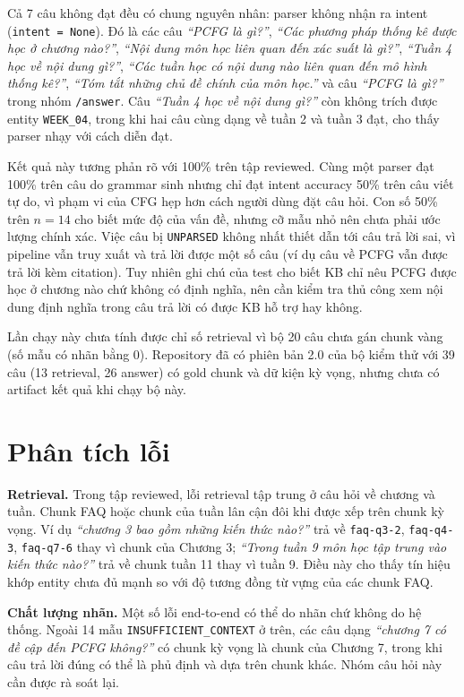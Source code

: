 Cả 7 câu không đạt đều có chung nguyên nhân: parser không nhận ra intent (\texttt{intent = None}). Đó là các câu \emph{``PCFG là gì?''}, \emph{``Các phương pháp thống kê được học ở chương nào?''}, \emph{``Nội dung môn học liên quan đến xác suất là gì?''}, \emph{``Tuần 4 học về nội dung gì?''}, \emph{``Các tuần học có nội dung nào liên quan đến mô hình thống kê?''}, \emph{``Tóm tắt những chủ đề chính của môn học.''} và câu \emph{``PCFG là gì?''} trong nhóm \texttt{/answer}. Câu \emph{``Tuần 4 học về nội dung gì?''} còn không trích được entity \texttt{WEEK\_04}, trong khi hai câu cùng dạng về tuần 2 và tuần 3 đạt, cho thấy parser nhạy với cách diễn đạt.

Kết quả này tương phản rõ với 100\% trên tập reviewed. Cùng một parser đạt 100\% trên câu do grammar sinh nhưng chỉ đạt intent accuracy 50\% trên câu viết tự do, vì phạm vi của CFG hẹp hơn cách người dùng đặt câu hỏi. Con số 50\% trên $n=14$ cho biết mức độ của vấn đề, nhưng cỡ mẫu nhỏ nên chưa phải ước lượng chính xác. Việc câu bị \texttt{UNPARSED} không nhất thiết dẫn tới câu trả lời sai, vì pipeline vẫn truy xuất và trả lời được một số câu (ví dụ câu về PCFG vẫn được trả lời kèm citation). Tuy nhiên ghi chú của test cho biết KB chỉ nêu PCFG được học ở chương nào chứ không có định nghĩa, nên cần kiểm tra thủ công xem nội dung định nghĩa trong câu trả lời có được KB hỗ trợ hay không.

Lần chạy này chưa tính được chỉ số retrieval vì bộ 20 câu chưa gán chunk vàng (số mẫu có nhãn bằng 0). Repository đã có phiên bản 2.0 của bộ kiểm thử với 39 câu (13 retrieval, 26 answer) có gold chunk và dữ kiện kỳ vọng, nhưng chưa có artifact kết quả khi chạy bộ này.

\section{Phân tích lỗi}

\textbf{Retrieval.} Trong tập reviewed, lỗi retrieval tập trung ở câu hỏi về chương và tuần. Chunk FAQ hoặc chunk của tuần lân cận đôi khi được xếp trên chunk kỳ vọng. Ví dụ \emph{``chương 3 bao gồm những kiến thức nào?''} trả về \texttt{faq-q3-2}, \texttt{faq-q4-3}, \texttt{faq-q7-6} thay vì chunk của Chương 3; \emph{``Trong tuần 9 môn học tập trung vào kiến thức nào?''} trả về chunk tuần 11 thay vì tuần 9. Điều này cho thấy tín hiệu khớp entity chưa đủ mạnh so với độ tương đồng từ vựng của các chunk FAQ.

\textbf{Chất lượng nhãn.} Một số lỗi end-to-end có thể do nhãn chứ không do hệ thống. Ngoài 14 mẫu \texttt{INSUFFICIENT\_CONTEXT} ở trên, các câu dạng \emph{``chương 7 có đề cập đến PCFG không?''} có chunk kỳ vọng là chunk của Chương 7, trong khi câu trả lời đúng có thể là phủ định và dựa trên chunk khác. Nhóm câu hỏi này cần được rà soát lại.

